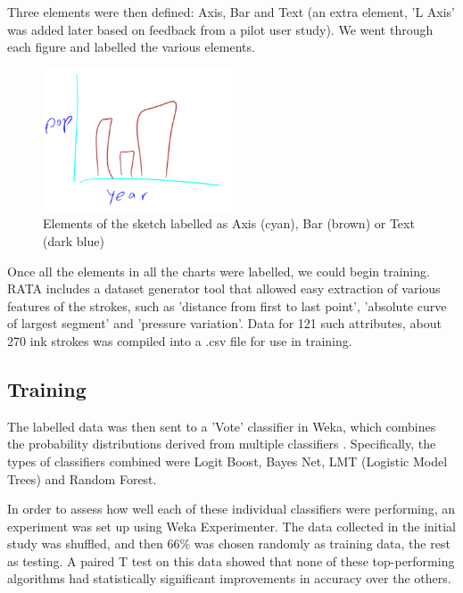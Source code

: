 	Three elements were then defined: Axis, Bar and Text (an extra element, 'L Axis' was added later based on feedback from a pilot user study). We went through each figure and labelled the various elements.
	
	\begin{figure}[H]
		\centering
		\includegraphics[width=0.5\textwidth]{collection_labelled}
		\caption{Elements of the sketch labelled as Axis (cyan), Bar (brown) or Text (dark blue)}
		\label{fig:collection_labelled}
	\end{figure}

	Once all the elements in all the charts were labelled, we could begin training. RATA includes a dataset generator tool that allowed easy extraction of various features of the strokes, such as 'distance from first to last point', 'absolute curve of largest segment' and 'pressure variation'. Data for 121 such attributes, about 270 ink strokes was compiled into a .csv file for use in training. 
	\subsection{Training}	
	The labelled data was then sent to a 'Vote' classifier in Weka, which combines the probability distributions derived from multiple classifiers \citep{kuncheva_combining_2004}. Specifically, the types of classifiers combined were Logit Boost, Bayes Net, LMT (Logistic Model Trees) and Random Forest. 
	
	In order to assess how well each of these individual classifiers were performing, an experiment was set up using Weka Experimenter. The data collected in the initial study was shuffled, and then 66\% was chosen randomly as training data, the rest as testing. A paired T test on this data showed that none of these top-performing algorithms had statistically significant improvements in accuracy over the others.
	
	

